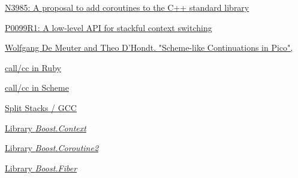 \begin{thebibliography}{99}

        \href{http://www.open-std.org/jtc1/sc22/wg21/docs/papers/2014/n3985.pdf}
        {N3985: A proposal to add coroutines to the C++ standard library}

        \href{http://www.open-std.org/jtc1/sc22/wg21/docs/papers/2016/p0099r1.pdf}
        {P0099R1: A low-level API for stackful context switching}

        \href{ftp://prog.vub.ac.be/pub/Courses/ICP2/PDF.dir/ContinuationsInPico.pdf}
        {Wolfgang De Meuter and Theo D’Hondt. "Scheme-like Continuations in Pico",}

        \href{http://gnuu.org/2009/03/21/demystifying-continuations-in-ruby}
        {call/cc in Ruby}

        \href{http://community.schemewiki.org/?call-with-current-continuation}
        {call/cc in Scheme}

        \href{http://gcc.gnu.org/wiki/SplitStacks}
        {Split Stacks / GCC}

        \href{http://www.boost.org/doc/libs/release/libs/context/doc/html/index.html}
        {Library \emph{Boost.Context}}

        \href{http://www.boost.org/doc/libs/release/libs/coroutine2/doc/html/index.html}
        {Library \emph{Boost.Coroutine2}}

        \href{http://www.boost.org/doc/libs/release/libs/fiber/doc/html/index.html}
        {Library \emph{Boost.Fiber}}

\end{thebibliography}

